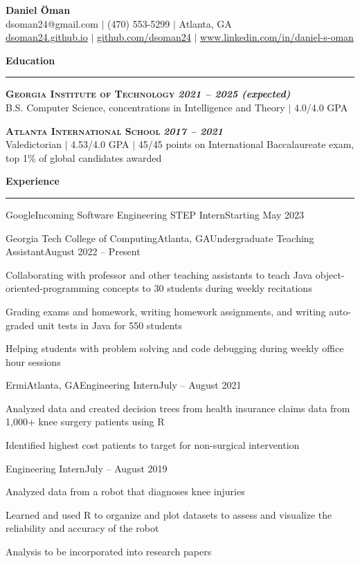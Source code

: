 \documentclass{article}
\newcommand{\horizontal}{\vspace{3pt}\hrule}
\newcommand{\school}[3]{\vspace{3pt}\textsc{\textbf{#1}} \hfill \textbf{\textit{#2}} \\ #3}
\newcommand{\sectitle}[1]{\vspace{3pt} \textbf{\large #1} \horizontal}
\begin{document}
\thispagestyle{empty}
\begin{center}
    \textbf{\LARGE Daniel Öman} \\
    dsoman24@gmail.com $|$ (470) 553-5299 $|$ Atlanta, GA \\
    \href{https://dsoman24.github.io/}{dsoman24.github.io} $|$ \href{https://github.com/dsoman24}{github.com/dsoman24} $|$ \href{https://www.linkedin.com/in/daniel-s-oman/}{www.linkedin.com/in/daniel-s-oman}
\end{center}

\begin{flushleft}
\sectitle{Education}

\school{Georgia Institute of Technology}{2021 -- 2025 (expected)}
{B.S. Computer Science, concentrations in Intelligence and Theory $|$ 4.0/4.0 GPA}

\school{Atlanta International School}{2017 -- 2021}
{Valedictorian $|$ 4.53/4.0 GPA $|$ 45/45 points on International Baccalaureate exam, top 1\% of global candidates awarded}

\sectitle{Experience}

    \begin{experience_no_list}{Google}{}{Incoming Software Engineering STEP Intern}{Starting May 2023}
    \end{experience_no_list}

    \begin{experience}{Georgia Tech College of Computing}{Atlanta, GA}{Undergraduate Teaching Assistant}{August 2022 -- Present}
        \item Collaborating with professor and other teaching assistants to teach Java object-oriented-programming concepts to 30 students during weekly recitations
        \item Grading exams and homework, writing homework assignments, and writing auto-graded unit tests in Java for 550 students
        \item Helping students with problem solving and code debugging during weekly office hour sessions
    \end{experience}

    \begin{experience}{Ermi}{Atlanta, GA}{Engineering Intern}{July -- August 2021}
        \item Analyzed data and created decision trees from health insurance claims data from 1,000+ knee surgery patients using R
        \item Identified highest cost patients to target for non-surgical intervention
    \end{experience}
    \begin{subexperience}{Engineering Intern}{July -- August 2019}
        \item Analyzed data from a robot that diagnoses knee injuries
        \item Learned and used R to organize and plot datasets to assess and visualize the reliability and accuracy of the robot
        \item Analysis to be incorporated into research papers
    \end{subexperience}


\end{flushleft}
\end{document}
